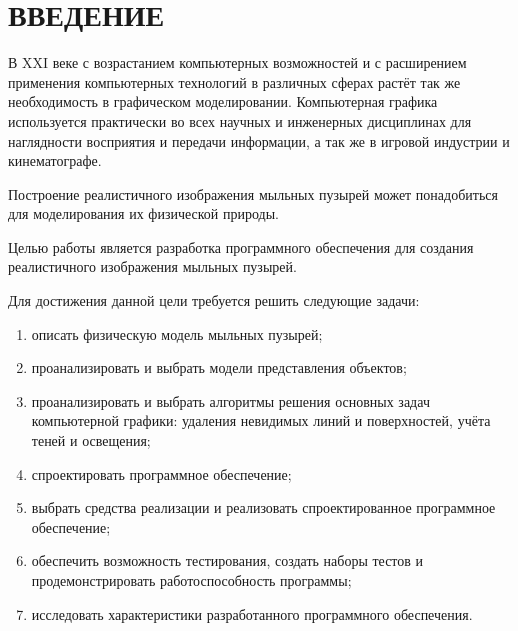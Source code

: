 \chapter*{ВВЕДЕНИЕ}

В XXI веке с возрастанием компьютерных возможностей и с расширением применения компьютерных технологий в различных сферах растёт так же необходимость в графическом моделировании. Компьютерная графика используется практически во всех научных и инженерных дисциплинах для наглядности восприятия и передачи информации, а так же в игровой индустрии и кинематографе. \cite{tomsk_2012}

Построение реалистичного изображения мыльных пузырей может понадобиться для моделирования их физической природы.

Целью работы является разработка программного обеспечения для создания реалистичного изображения мыльных пузырей.

Для достижения данной цели требуется решить следующие задачи:
\begin{enumerate}[label=\arabic*)]
    \item описать физическую модель мыльных пузырей;
    \item проанализировать и выбрать модели представления объектов;
    \item проанализировать и выбрать алгоритмы решения основных задач компьютерной графики: удаления невидимых линий и поверхностей, учёта теней и освещения;
    \item спроектировать программное обеспечение;
    \item выбрать средства реализации и реализовать спроектированное программное обеспечение;
    \item обеспечить возможность тестирования, создать наборы тестов и продемонстрировать работоспособность программы;
    \item исследовать характеристики разработанного программного обеспечения.
\end{enumerate}